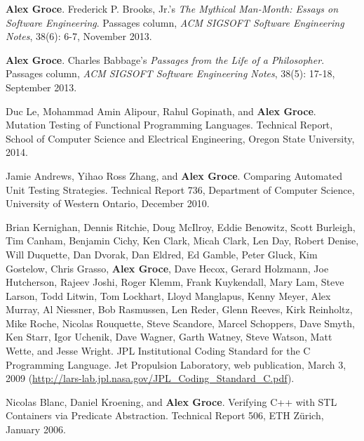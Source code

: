 \documentclass[ComputerScience]{vita}
\begin{document}
\begin{vita}
\begin{Columns, Book Reviews, and Magazine Articles}
\item {\bf Alex Groce}.
\newblock Frederick P. Brooks, Jr.'s \emph{The Mythical Man-Month: Essays on Software Engineering}.
\newblock Passages column, \emph{ACM SIGSOFT Software Engineering Notes}, 38(6): 6-7, November 2013.

\item {\bf Alex Groce}.
\newblock Charles Babbage's \emph{Passages from the Life of a Philosopher}.
\newblock Passages column, \emph{ACM SIGSOFT Software Engineering Notes}, 38(5): 17-18, September 2013.
\end{Columns, Book Reviews, and Magazine Articles}

\begin{Technical Reports}
\item
Duc Le, Mohammad Amin Alipour, Rahul Gopinath, and {\bf Alex Groce}.
\newblock Mutation Testing of Functional Programming Languages.
\newblock Technical Report, School of Computer Science and Electrical Engineering, Oregon State University, 2014.

\item
Jamie Andrews, Yihao Ross Zhang, and {\bf Alex Groce}.
\newblock Comparing Automated Unit Testing Strategies.
\newblock Technical Report 736, Department of Computer Science, University of Western Ontario, December 2010.

\item
Brian Kernighan, Dennis Ritchie, Doug McIlroy, Eddie Benowitz, Scott Burleigh, Tim Canham, Benjamin Cichy, Ken Clark, Micah Clark, Len Day, Robert Denise, Will Duquette, Dan Dvorak, Dan Eldred, Ed Gamble, Peter Gluck, Kim Gostelow, Chris Grasso, {\bf Alex Groce}, Dave Hecox, Gerard Holzmann, Joe Hutcherson, Rajeev Joshi, Roger Klemm, Frank Kuykendall, Mary Lam, Steve Larson, Todd Litwin, Tom Lockhart, Lloyd Manglapus, Kenny Meyer, Alex Murray, Al Niessner, Bob Rasmussen, Len Reder, Glenn Reeves, Kirk Reinholtz, Mike Roche, Nicolas Rouquette, Steve Scandore, Marcel Schoppers, Dave Smyth, Ken Starr, Igor Uchenik, Dave Wagner, Garth Watney, Steve Watson, Matt Wette, and Jesse Wright.
\newblock JPL Institutional Coding Standard for the C Programming Language.
\newblock Jet Propulsion Laboratory, web publication, March 3, 2009 (\url{http://lars-lab.jpl.nasa.gov/JPL\_Coding\_Standard\_C.pdf}).

\item
Nicolas Blanc, Daniel Kroening, and {\bf Alex Groce}.
\newblock Verifying C++ with STL Containers via Predicate Abstraction.
\newblock Technical Report 506, ETH Z\"urich, January 2006.


\end{Technical Reports}
\end{vita}
\end{document}
